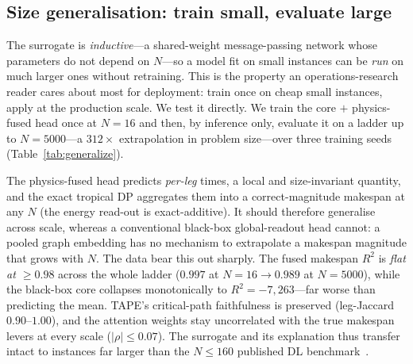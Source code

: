 \documentclass[11pt]{article}
\begin{document}
\subsection{Size generalisation: train small, evaluate large}
\label{sec:generalize}
The surrogate is \emph{inductive}---a shared-weight message-passing network whose parameters
do not depend on $N$---so a model fit on small instances can be \emph{run} on much larger
ones without retraining. This is the property an operations-research reader cares about most
for deployment: train once on cheap small instances, apply at the production scale. We test
it directly. We train the core $+$ physics-fused head once at $N{=}16$ and then, by
inference only, evaluate it on a ladder up to $N{=}5000$---a $312\times$ extrapolation in
problem size---over three training seeds (Table~\ref{tab:generalize}).

The physics-fused head predicts \emph{per-leg} times, a local and size-invariant quantity,
and the exact tropical DP aggregates them into a correct-magnitude makespan at any $N$ (the
energy read-out is exact-additive). It should therefore generalise across scale, whereas a
conventional black-box global-readout head cannot: a pooled graph embedding has no mechanism
to extrapolate a makespan magnitude that grows with $N$. The data bear this out sharply. The
fused makespan $R^2$ is \emph{flat at $\geq 0.98$} across the whole ladder
($0.997$ at $N{=}16 \to 0.989$ at $N{=}5000$), while the black-box core collapses
monotonically to $R^2=-7{,}263$---far worse than predicting the mean. TAPE's critical-path
faithfulness is preserved (leg-Jaccard $0.90$--$1.00$), and the attention weights stay
uncorrelated with the true makespan levers at every scale ($|\rho|\le0.07$). The surrogate
and its explanation thus transfer intact to instances far larger than the $N\leq160$
published \textsf{DL} benchmark~\cite{homayouni2022book}.
\end{document}

